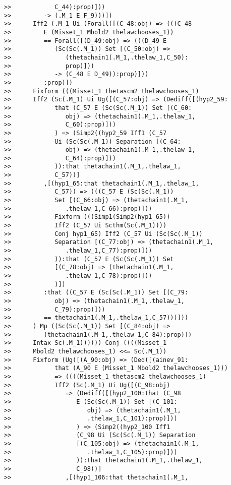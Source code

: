 \documentclass[12pt]{article}
\begin{document}
\begin{verbatim}
>>            C_44):prop)]))
>>         -> (.M_1 E F_9)))])
>>      Iff2 (.M_1 Ui (Forall([(C_48:obj) => (((C_48
>>         E (Misset_1 Mbold2 thelawchooses_1))
>>         == Forall([(D_49:obj) => (((D_49 E
>>            (Sc(Sc(.M_1)) Set [(C_50:obj) =>
>>               (thetachain1(.M_1,.thelaw_1,C_50):
>>               prop)]))
>>            -> (C_48 E D_49)):prop)]))
>>         :prop)])
>>      Fixform (((Misset_1 thetascm2 thelawchooses_1)
>>      Iff2 (Sc(.M_1) Ui Ug([(C_57:obj) => (Dediff([(hyp2_59:
>>            that (C_57 E (Sc(Sc(.M_1)) Set [(C_60:
>>               obj) => (thetachain1(.M_1,.thelaw_1,
>>               C_60):prop)]))
>>            ) => (Simp2((hyp2_59 Iff1 (C_57
>>            Ui (Sc(Sc(.M_1)) Separation [(C_64:
>>               obj) => (thetachain1(.M_1,.thelaw_1,
>>               C_64):prop)]))
>>            )):that thetachain1(.M_1,.thelaw_1,
>>            C_57))]
>>         ,[(hyp1_65:that thetachain1(.M_1,.thelaw_1,
>>            C_57)) => (((C_57 E (Sc(Sc(.M_1))
>>            Set [(C_66:obj) => (thetachain1(.M_1,
>>               .thelaw_1,C_66):prop)]))
>>            Fixform (((Simp1(Simp2(hyp1_65))
>>            Iff2 (C_57 Ui Scthm(Sc(.M_1))))
>>            Conj hyp1_65) Iff2 (C_57 Ui (Sc(Sc(.M_1))
>>            Separation [(C_77:obj) => (thetachain1(.M_1,
>>               .thelaw_1,C_77):prop)]))
>>            )):that (C_57 E (Sc(Sc(.M_1)) Set
>>            [(C_78:obj) => (thetachain1(.M_1,
>>               .thelaw_1,C_78):prop)]))
>>            )])
>>         :that ((C_57 E (Sc(Sc(.M_1)) Set [(C_79:
>>            obj) => (thetachain1(.M_1,.thelaw_1,
>>            C_79):prop)]))
>>         == thetachain1(.M_1,.thelaw_1,C_57)))]))
>>      ) Mp ((Sc(Sc(.M_1)) Set [(C_84:obj) =>
>>         (thetachain1(.M_1,.thelaw_1,C_84):prop)])
>>      Intax Sc(.M_1)))))) Conj ((((Misset_1
>>      Mbold2 thelawchooses_1) <<= Sc(.M_1))
>>      Fixform (Ug([(A_90:obj) => (Ded([(ainev_91:
>>            that (A_90 E (Misset_1 Mbold2 thelawchooses_1)))
>>            => ((((Misset_1 thetascm2 thelawchooses_1)
>>            Iff2 (Sc(.M_1) Ui Ug([(C_98:obj)
>>               => (Dediff([(hyp2_100:that (C_98
>>                  E (Sc(Sc(.M_1)) Set [(C_101:
>>                     obj) => (thetachain1(.M_1,
>>                     .thelaw_1,C_101):prop)]))
>>                  ) => (Simp2((hyp2_100 Iff1
>>                  (C_98 Ui (Sc(Sc(.M_1)) Separation
>>                  [(C_105:obj) => (thetachain1(.M_1,
>>                     .thelaw_1,C_105):prop)]))
>>                  )):that thetachain1(.M_1,.thelaw_1,
>>                  C_98))]
>>               ,[(hyp1_106:that thetachain1(.M_1,

\end{verbatim}
\end{document}
